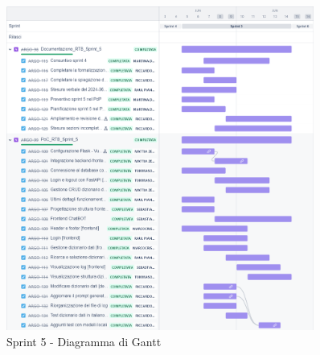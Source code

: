 \begin{figure}[H]
  \centering
  \includegraphics[width=0.90\textwidth]{assets/Pianificazione/Sprint-5/gantt.png}
  \caption{Sprint 5 - Diagramma di Gantt}\label{fig:sprint-5-gantt}
\end{figure}